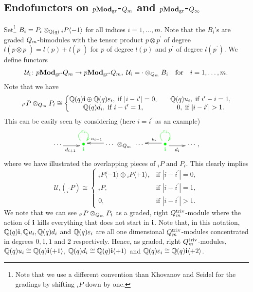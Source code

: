\subsection{Endofunctors on \texorpdfstring{$p\boldsymbol{\mathrm{Mod}}_{\mathrm{gr}}$-$Q_{m}$}{pMod-Qm} and \texorpdfstring{$p\boldsymbol{\mathrm{Mod}}_{\mathrm{gr}}$-$Q_{\infty}$}{pMod-Qin}}\label{sub-endo}
Set\footnote{Note that we use a different convention than Khovanov and Seidel for the gradings by shifting ${}_iP$ down by one.} 
$B_i=P_i\otimes_{\mathbb{Q}(q)}{}_iP\langle -1\rangle$ for all 
indices $i=1,\dots,m$. Note that the $B_i$'s are 
graded $Q_{m}$-bimodules with the tensor product 
$p\otimes p^{\prime}$ of degree $l(p\otimes p^{\prime})=l(p)+l(p^{\prime})$ 
for $p$ of degree $l(p)$ and $p^{\prime}$ of degree $l(p^{\prime})$. 
We define functors
\[
\mathcal U_i\colon p\boldsymbol{\mathrm{Mod}}_{\mathrm{gr}}\text{-}Q_m\to p\boldsymbol{\mathrm{Mod}}_{\mathrm{gr}}\text{-}Q_m,\;\mathcal U_i= \cdot \otimes_{Q_{m}}B_i\quad\text{for}\quad i=1,\dots,m.
\]
Note that we have
\begin{equation}\label{eq-ufunctors}
{}_{i^{\prime}}P\otimes_{\Am}P_i\cong\biggl\{
\begin{matrix}
 \bC\bbi\oplus\bC\varepsilon_i,\; \text{if }|i-i^{\prime}|=0, & & \bC u_{i},\;\text{if }i^{\prime}-i=1,\\
 \bC d_{i},\;\text{if }i-i^{\prime}=1, & & 0,\;\text{if }|i-i^{\prime}|>1.
\end{matrix}
\end{equation}
This can be easily seen by considering (here $i=i^{\prime}$ as an example)
\[
\xymatrix{
   \cdots \ar@<-2pt>[r]_{d_{i+1}} & \raisebox{0.1cm}{\xy(0,0)*{{\color{green}\bullet}};(0,-2.5)*{{\color{green}\scriptstyle \bbi}};\endxy}\ar@[green]@(ul,ur)|{{\color{green}\varepsilon_i}}   &\cdots \ar@<-2pt>[l]_{u_{i-1}}\\
}\otimes_{\Am}\xymatrix{
  \cdots  & \raisebox{0.1cm}{\xy(0,0)*{{\color{green}\bullet}};(0,-2.5)*{{\color{green}\scriptstyle \bbi}};\endxy}\ar@[green]@(ul,ur)|{{\color{green}\varepsilon_i}}  \ar@<-2pt>[l]_/-0.3em/{u_i}\ar@<-2pt>[r]_/-0.3em/{d_i} &\cdots, \\
}
\]
where we have illustrated the 
overlapping pieces of ${}_iP$ and $P_i$. This clearly implies
\begin{equation}\label{eq-tlcat}
\mathcal U_i ({}_{i^{\prime}}P)\cong\begin{cases}{}_iP\langle -1\rangle\oplus {}_iP\langle +1\rangle,&\text{if }|i-i^{\prime}|=0,\\
{}_iP,&\text{if }|i-i^{\prime}|=1,\\
0,&\text{if }|i-i^{\prime}|>1.\end{cases}
\end{equation}
We note that we can see ${}_{i^{\prime}}P\otimes_{Q_{m}}P_i$ as a 
graded, right $Q_m^{\mathrm{triv}}$-module where the action of $\boldsymbol{\mathrm{i}}$ kills 
everything that does not start in $\boldsymbol{\mathrm{i}}$. Note that, in this 
notation, $\mathbb{Q}(q)\boldsymbol{\mathrm{i}},\mathbb{Q} u_{i},\mathbb{Q}(q) d_{i}$ and $\mathbb{Q}(q)\varepsilon_i$ 
are all one dimensional $Q_m^{\mathrm{triv}}$-modules concentrated 
in degrees $0,1,1$ and $2$ respectively.
Hence, as graded, 
right $Q_m^{\mathrm{triv}}$-modules, 
$\mathbb{Q}(q) u_{i}\cong\mathbb{Q}(q) \boldsymbol{\mathrm{i}}\langle+1\rangle$, $\mathbb{Q}(q) d_{i}\cong\mathbb{Q}(q) \boldsymbol{\mathrm{i}}\langle+1\rangle$ and $\mathbb{Q}(q) \varepsilon_{i}\cong\mathbb{Q}(q) \boldsymbol{\mathrm{i}}\langle+2\rangle$.



